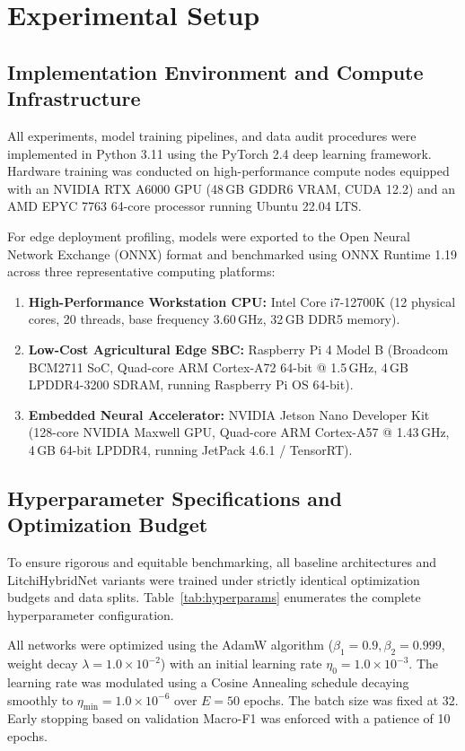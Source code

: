 \section{Experimental Setup}
\label{sec:setup}

\subsection{Implementation Environment and Compute Infrastructure}
All experiments, model training pipelines, and data audit procedures were implemented in Python 3.11 using the PyTorch 2.4 deep learning framework. Hardware training was conducted on high-performance compute nodes equipped with an NVIDIA RTX A6000 GPU (48\,GB GDDR6 VRAM, CUDA 12.2) and an AMD EPYC 7763 64-core processor running Ubuntu 22.04 LTS.

For edge deployment profiling, models were exported to the Open Neural Network Exchange (ONNX) format and benchmarked using ONNX Runtime 1.19 across three representative computing platforms:
\begin{enumerate}
    \item \textbf{High-Performance Workstation CPU:} Intel Core i7-12700K (12 physical cores, 20 threads, base frequency 3.60\,GHz, 32\,GB DDR5 memory).
    \item \textbf{Low-Cost Agricultural Edge SBC:} Raspberry Pi 4 Model B (Broadcom BCM2711 SoC, Quad-core ARM Cortex-A72 64-bit @ 1.5\,GHz, 4\,GB LPDDR4-3200 SDRAM, running Raspberry Pi OS 64-bit).
    \item \textbf{Embedded Neural Accelerator:} NVIDIA Jetson Nano Developer Kit (128-core NVIDIA Maxwell GPU, Quad-core ARM Cortex-A57 @ 1.43\,GHz, 4\,GB 64-bit LPDDR4, running JetPack 4.6.1 / TensorRT).
\end{enumerate}

\subsection{Hyperparameter Specifications and Optimization Budget}
To ensure rigorous and equitable benchmarking, all baseline architectures and LitchiHybridNet variants were trained under strictly identical optimization budgets and data splits. Table~\ref{tab:hyperparams} enumerates the complete hyperparameter configuration.



All networks were optimized using the AdamW algorithm ($\beta_1 = 0.9, \beta_2 = 0.999$, weight decay $\lambda = 1.0 \times 10^{-2}$) with an initial learning rate $\eta_0 = 1.0 \times 10^{-3}$. The learning rate was modulated using a Cosine Annealing schedule decaying smoothly to $\eta_{\min} = 1.0 \times 10^{-6}$ over $E = 50$ epochs. The batch size was fixed at 32. Early stopping based on validation Macro-F1 was enforced with a patience of 10 epochs.

